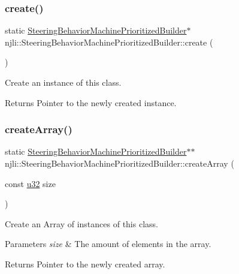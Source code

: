 \subsubsection{\texorpdfstring{create()}{create()}}
{\footnotesize\ttfamily static \mbox{\hyperlink{classnjli_1_1_steering_behavior_machine_prioritized_builder}{Steering\+Behavior\+Machine\+Prioritized\+Builder}}$\ast$ njli\+::\+Steering\+Behavior\+Machine\+Prioritized\+Builder\+::create (\begin{DoxyParamCaption}{ }\end{DoxyParamCaption})\hspace{0.3cm}{\ttfamily [static]}}

Create an instance of this class.

\begin{DoxyReturn}{Returns}
Pointer to the newly created instance. 
\end{DoxyReturn}
\mbox{\label{classnjli_1_1_steering_behavior_machine_prioritized_builder_ad4cf91f79d4584cabf80a94ce5577eec}} 
\subsubsection{\texorpdfstring{create\+Array()}{createArray()}}
{\footnotesize\ttfamily static \mbox{\hyperlink{classnjli_1_1_steering_behavior_machine_prioritized_builder}{Steering\+Behavior\+Machine\+Prioritized\+Builder}}$\ast$$\ast$ njli\+::\+Steering\+Behavior\+Machine\+Prioritized\+Builder\+::create\+Array (\begin{DoxyParamCaption}\item[{const \mbox{\hyperlink{_util_8h_a10e94b422ef0c20dcdec20d31a1f5049}{u32}}}]{size }\end{DoxyParamCaption})\hspace{0.3cm}{\ttfamily [static]}}

Create an Array of instances of this class.


\begin{DoxyParams}{Parameters}
{\em size} & The amount of elements in the array.\\
\hline
\end{DoxyParams}
\begin{DoxyReturn}{Returns}
Pointer to the newly created array. 
\end{DoxyReturn}
\mbox{\label{classnjli_1_1_steering_behavior_machine_prioritized_builder_a421191e002bd0e57fb5db748dc0b9f19}} 
